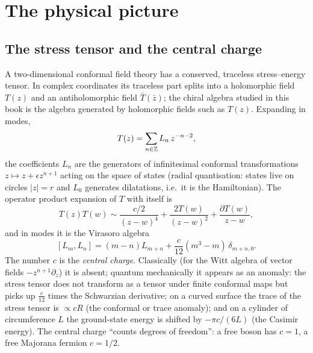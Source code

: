 \section{The physical picture}\label{l06:sec:physics}

\subsection{The stress tensor and the central charge}

A two-dimensional conformal field theory has a conserved, traceless stress--energy tensor. In complex
coordinates its traceless part splits into a holomorphic field $T(z)$ and an antiholomorphic field
$\bar T(\bar z)$; the chiral algebra studied in this book is the algebra generated by holomorphic
fields such as $T(z)$. Expanding in modes,
\begin{equation}\label{l06:eq:Tmodes}
 T(z) = \sum_{n\in{\mathbb{Z}}}L_n\,z^{-n-2},
\end{equation}
the coefficients $L_n$ are the generators of infinitesimal conformal transformations
$z\mapsto z+\epsilon z^{n+1}$ acting on the space of states (radial quantisation: states live on
circles $|z| = r$ and $L_0$ generates dilatations, i.e.\ it is the Hamiltonian). The operator product
expansion of $T$ with itself is
\begin{equation}\label{l06:eq:TT}
 T(z)T(w) \sim \frac{c/2}{(z-w)^4} + \frac{2T(w)}{(z-w)^2} + \frac{\partial T(w)}{z-w},
\end{equation}
and in modes it is the Virasoro algebra
\begin{equation}\label{l06:eq:vir}
 [L_m,L_n] = (m-n)L_{m+n} + \frac{c}{12}(m^3-m)\,\delta_{m+n,0}.
\end{equation}
The number $c$ is the \emph{central charge}. Classically (for the Witt algebra of vector fields
$-z^{n+1}\partial_z$) it is absent; quantum mechanically it appears as an anomaly: the stress tensor
does not transform as a tensor under finite conformal maps but picks up $\frac{c}{12}$ times the
Schwarzian derivative; on a curved surface the trace of the stress tensor is $\propto c R$ (the
conformal or trace anomaly); and on a cylinder of circumference $L$ the ground-state energy is shifted
by $-\pi c/(6L)$ (the Casimir energy). The central charge ``counts degrees of freedom'': a free boson
has $c = 1$, a free Majorana fermion $c = 1/2$.

